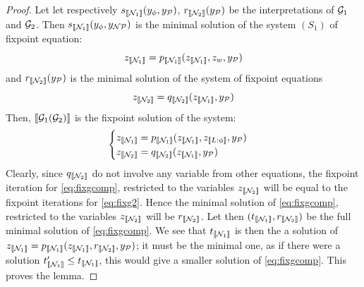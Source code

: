 \begin{proof}
	Let let respectively $s_{\llbracket\mathcal{N}_1\rrbracket}(y_\phi, y_{{\mathcal{P}}})$, $r_{\llbracket\mathcal{N}_2\rrbracket}(y_{{\mathcal{P}}})$ be the interpretations of $\mathcal{G}_1$ and $\mathcal{G}_2$. Then $s_{\llbracket\mathcal{N}_1\rrbracket}(y_\phi, y_{\mathcal{N}{\mathcal{P}}})$ is the minimal solution of the system $(S_1)$ of fixpoint equation:
	\begin{equation}
		\label{eq:fixg1}
		z_{\llbracket\mathcal{N}_1\rrbracket}= p_{\llbracket\mathcal{N}_1\rrbracket}(z_{\llbracket\mathcal{N}_1\rrbracket}, z_w,y_{\mathcal{P}} )
	\end{equation}
	and  $r_{\llbracket\mathcal{N}_2\rrbracket}(y_{{\mathcal{P}}})$  is the minimal solution of the system of fixpoint equations 
	\begin{equation}
		\label{eq:fixg2}
		z_{\llbracket\mathcal{N}_2\rrbracket}= q_{\llbracket\mathcal{N}_2\rrbracket}(z_{\llbracket\mathcal{N}_1\rrbracket}, y_{\mathcal{P}} )
	\end{equation} 
	Then, $\llbracket\mathcal{G}_1(\mathcal{G}_2)\rrbracket$ is the fixpoint solution of the system:
	\begin{equation}
		\label{eq:fixgcomp}
		\begin{cases}
			z_{\llbracket\mathcal{N}_1\rrbracket}= p_{\llbracket\mathcal{N}_1\rrbracket}(z_{\llbracket\mathcal{N}_1\rrbracket}, z_{\llbracket L: \phi\rrbracket},y_{\mathcal{P}} )\\
			z_{\llbracket\mathcal{N}_2\rrbracket}= q_{\llbracket\mathcal{N}_2\rrbracket}(z_{\llbracket\mathcal{N}_1\rrbracket}, y_{\mathcal{P}} )
		\end{cases}
	\end{equation}
	Clearly, since $q_{\llbracket\mathcal{N}_2\rrbracket}$ do not involve any variable from other equations, the fixpoint iteration for \ref{eq:fixgcomp}, restricted to the variables $z_{\llbracket\mathcal{N}_2\rrbracket}$ will be equal to the fixpoint iterations for \ref{eq:fixg2}. Hence the minimal solution of \ref{eq:fixgcomp}, restricted to the variables $z_{\llbracket\mathcal{N}_2\rrbracket}$ will be  $r_{\llbracket\mathcal{N}_2\rrbracket}$. Let then $(t_{\llbracket\mathcal{N}_1\rrbracket},r_{\llbracket\mathcal{N}_2\rrbracket})$ be the full minimal solution of \ref{eq:fixgcomp}. We see that $t_{\llbracket\mathcal{N}_1\rrbracket}$ is then the a solution of $z_{\llbracket\mathcal{N}_1\rrbracket}= p_{\llbracket\mathcal{N}_1\rrbracket}(z_{\llbracket\mathcal{N}_1\rrbracket}, r_{\llbracket\mathcal{N}_2\rrbracket} ,y_{\mathcal{P}} )$; it must be the minimal one, as if there were a solution $t'_{\llbracket\mathcal{N}_1\rrbracket} \leq t_{\llbracket\mathcal{N}_1\rrbracket}$, this would give a smaller solution of \ref{eq:fixgcomp}. This proves the lemma.
\end{proof}
